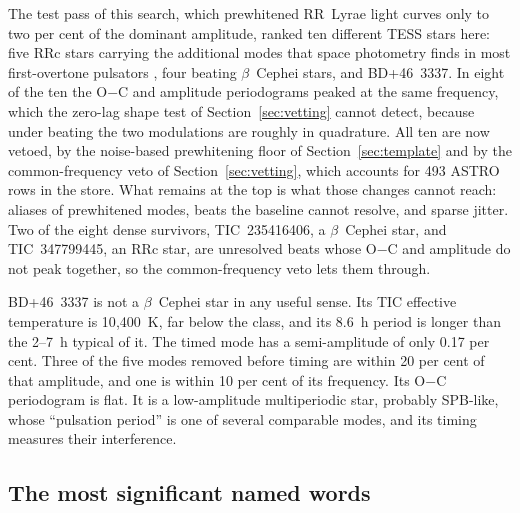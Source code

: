 \documentclass[final,5p]{elsarticle}
\newcommand{\oc}{O$-$C}
\newcommand{\bcep}{\ensuremath{\beta}~Cephei}
\begin{document}
The test pass of this search, which prewhitened RR~Lyrae light curves only to two per cent of the dominant amplitude, ranked ten different TESS stars here: five RRc stars carrying the additional modes that space photometry finds in most first-overtone pulsators \citep{Moskalik2015, Netzel2019, Netzel2023, Netzel2024}, four beating \bcep{} stars, and BD+46~3337. In eight of the ten the \oc{} and amplitude periodograms peaked at the same frequency, which the zero-lag shape test of Section~\ref{sec:vetting} cannot detect, because under beating the two modulations are roughly in quadrature. All ten are now vetoed, by the noise-based prewhitening floor of Section~\ref{sec:template} and by the common-frequency veto of Section~\ref{sec:vetting}, which accounts for 493 ASTRO rows in the store. What remains at the top is what those changes cannot reach: aliases of prewhitened modes, beats the baseline cannot resolve, and sparse jitter. Two of the eight dense survivors, TIC~235416406, a \bcep{} star, and TIC~347799445, an RRc star, are unresolved beats whose \oc{} and amplitude do not peak together, so the common-frequency veto lets them through.

BD+46~3337 is not a \bcep{} star in any useful sense. Its TIC effective temperature is 10{,}400~K, far below the class, and its 8.6~h period is longer than the 2--7~h typical of it. The timed mode has a semi-amplitude of only 0.17 per cent. Three of the five modes removed before timing are within 20 per cent of that amplitude, and one is within 10 per cent of its frequency. Its \oc{} periodogram is flat. It is a low-amplitude multiperiodic star, probably SPB-like, whose ``pulsation period'' is one of several comparable modes, and its timing measures their interference.

\subsection{The most significant named words}
\label{sec:topseq}
\end{document}
